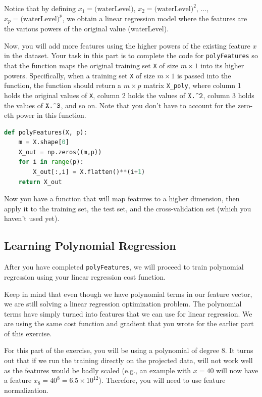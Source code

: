 \documentclass[12pt]{article}
\begin{document}
Notice that by defining $x_1 = \text{(waterLevel)}$, $x_2 = \text{(waterLevel)}^2$, $\dots$, $x_p = \text{(waterLevel)}^p$, we obtain a linear regression model where the features are the various powers of the original value (waterLevel).

Now, you will add more features using the higher powers of the existing feature $x$ in the dataset. Your task in this part is to complete the code for \texttt{polyFeatures} so that the function maps the original training set \texttt{X} of size $m \times 1$ into its higher powers. Specifically, when a training set \texttt{X} of size $m \times 1$ is passed into the function, the function should return a $m \times p$ matrix \texttt{X\_poly}, where column 1 holds the original values of \texttt{X}, column 2 holds the values of $\verb!X.^2!$, column 3 holds the values of $\verb!X.^3!$, and so on. Note that you don’t have to account for the zero-eth power in this function.

\begin{lstlisting}[language=Python]
  def polyFeatures(X, p):
    m = X.shape[0]
    X_out = np.zeros((m,p))
    for i in range(p):
        X_out[:,i] = X.flatten()**(i+1)
    return X_out
\end{lstlisting}


Now you have a function that will map features to a higher dimension, then apply it to the training set, the test set, and the cross-validation set (which you haven’t used yet).

\subsection{Learning Polynomial Regression}

After you have completed \texttt{polyFeatures}, we will proceed to train polynomial regression using your linear regression cost function.

Keep in mind that even though we have polynomial terms in our feature vector, we are still solving a linear regression optimization problem. The polynomial terms have simply turned into features that we can use for linear regression. We are using the same cost function and gradient that you wrote for the earlier part of this exercise.

For this part of the exercise, you will be using a polynomial of degree 8. It turns out that if we run the training directly on the projected data, will not work well as the features would be badly scaled (e.g., an example with $x = 40$ will now have a feature $x_8 = 40^8 = 6.5 \times 10^{12}$). Therefore, you will need to use feature normalization.
\end{document}
